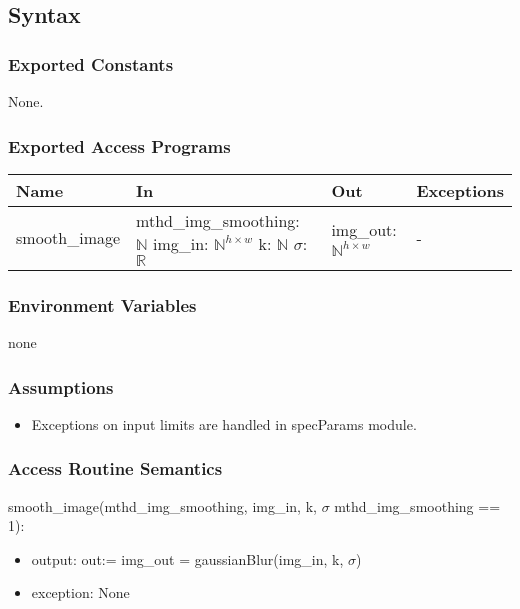 \documentclass[12pt, titlepage]{article}
\begin{document}
\subsection{Syntax}
\subsubsection{Exported Constants}
None.
\subsubsection{Exported Access Programs}
\begin{center}
  \begin{tabular}{p{4cm} p{4.5cm} p{4cm} p{2cm}}
  \hline
  \textbf{Name} & \textbf{In} & \textbf{Out} & \textbf{Exceptions} \\
  \hline
  smooth\_image
  & mthd\_img\_smoothing: $\mathbb{N}$ \newline
  img\_in: $\mathbb{N}^{h \times w}$ \newline
  k: $\mathbb{N}$ \newline
  $\sigma$: $\mathbb{R}$
  & img\_out: $\mathbb{N}^{h \times w}$
  & - \\
  \hline
  \end{tabular}
  \end{center}

\subsubsection{Environment Variables}
none

\subsubsection{Assumptions}
  \begin{itemize}
  \item Exceptions on input limits are handled in specParams module.
  \end{itemize}

\subsubsection{Access Routine Semantics}

\noindent smooth\_image(mthd\_img\_smoothing, img\_in, 
k, $\sigma$ \textbar \: mthd\_img\_smoothing == 1):
\begin{itemize}
\item output: out:= img\_out = gaussianBlur(img\_in, 
  k, $\sigma$)
\item exception: None
\end{itemize}
\end{document}
